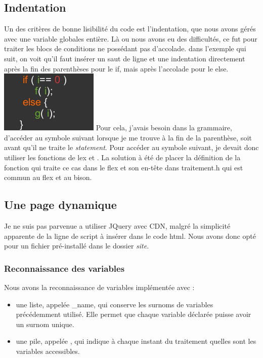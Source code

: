 \documentclass[10pt,a4paper]{report}
\begin{document}
\subsection{Indentation}
	Un des critères de bonne lisibilité du code est l'indentation, que nous avons gérés avec une variable globales entière. Là ou nous avons eu des difficultés, ce fut pour traiter les blocs de conditions ne possédant pas d'accolade.
	\newline
	dans l'exemple qui suit, on voit qu'il faut insérer un saut de ligne et une indentation directement après la fin des parenthèses pour le if, mais après l'accolade pour le else. \newline
\includegraphics{indent1.png}
\newline 
Pour cela, j'avais besoin dans la grammaire, d'accéder au symbole suivant lorsque je me trouve à la fin de la parenthèse, soit avant qu'il ne traite le \textit{statement}. 
\newline 
Pour accéder au symbole suivant, je devait donc utiliser les fonctions de lex {\bfinput} et {\bfunput}. \newline
La solution à été de placer la définition de la fonction qui traite ce cas dans le flex et son en-tête dans traitement.h qui est commun au flex et au bison.

\subsection{Une page dynamique}
Je ne suis pas parvenue a utiliser JQuery avec CDN, malgré la simplicité apparente de la ligne de script à insérer dans le code html. Nous avons donc opté pour un fichier pré-installé dans le dossier \textit{site}. \newline


\subsubsection*{Reconnaissance des variables}
Nous avons la reconnaissance de variables implémentée avec :
\begin{itemize}
	\item une liste, appelée {\bfvariables\_name}, qui conserve les surnoms de variables précédemment utilisé. Elle permet que chaque variable déclarée puisse avoir un surnom unique.
	\item une pile, appelée {\bfvariables}, qui indique à chaque instant du traitement quelles sont les variables accessibles.
\end{itemize}
\end{document}
